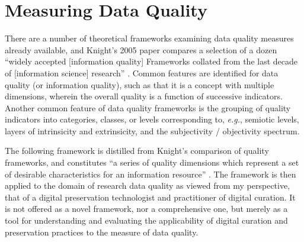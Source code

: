 \documentclass{acm_proc_article-sp}
\begin{document}
\section{Measuring Data Quality}
There are a number of theoretical frameworks examining data quality
measures already available, and Knight's 2005 paper compares a
selection of a dozen ``widely accepted [information quality]
Frameworks collated from the last decade of [information science]
research'' \cite{knight:quality}. Common features are identified for
data quality (or information quality), such as that it is a concept
with multiple dimensions, wherein the overall quality is a function of
successive indicators.  Another common feature of data quality
frameworks is the grouping of quality indicators into categories,
classes, or levels corresponding to, \textit{e.g.}, semiotic levels,
layers of intrinsicity and extrinsicity, and the subjectivity /
objectivity spectrum.

The following framework is distilled from Knight's comparison of
quality frameworks, and constitutes ``a series of quality dimensions
which represent a set of desirable characteristics for an information
resource'' \cite{curry:community}. The framework is then applied to
the domain of research data quality as viewed from my perspective,
that of a digital preservation technologist and practitioner of
digital curation. It is not offered as a novel framework, nor a
comprehensive one, but merely as a tool for understanding and
evaluating the applicability of digital curation and preservation
practices to the measure of data quality.
\end{document}
